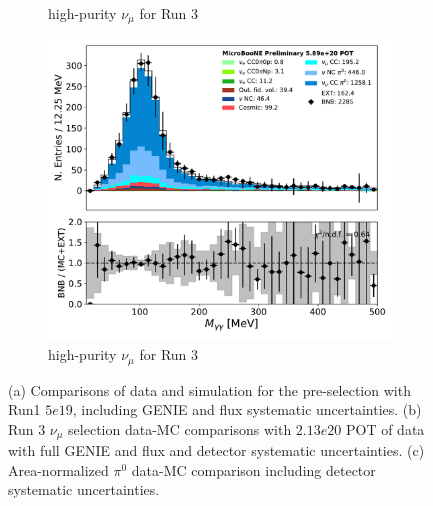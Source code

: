 \begin{figure}[ht]
\begin{center}
\begin{subfigure}[b]{0.3\textwidth}
    \caption{\label{fig:datamccomparisons:numu} high-purity $\nu_{\mu}$ for Run 3}
    \end{subfigure}
    \begin{subfigure}[b]{0.3\textwidth}
    \centering
    \includegraphics[width=1.00\textwidth]{detsys/datamc/pi0_mass_Y_03292020_detsys.pdf}
    \caption{\label{fig:datamccomparisons:pi0} high-purity $\nu_{\mu}$ for Run 3}
    \end{subfigure}
\caption{\label{fig:datamccomparisons} (a) Comparisons of data and simulation for the \npsel pre-selection with Run1 $5e19$, including GENIE and flux systematic uncertainties. (b) Run 3 $\nu_{\mu}$ selection data-MC comparisons with $2.13e20$ POT of data with full GENIE and flux and detector systematic uncertainties. (c) Area-normalized $\pi^0$ data-MC comparison including detector systematic uncertainties.}
\end{center}
\end{figure}

